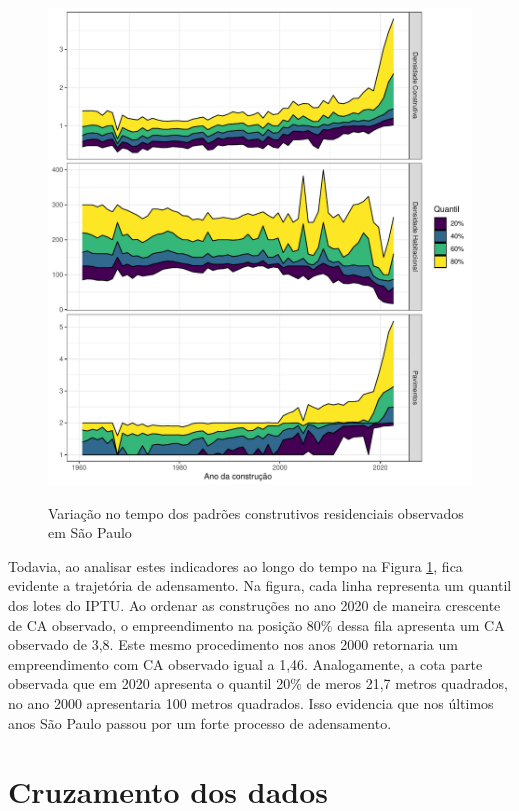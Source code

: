 \begin{figure}[h]
    \centering
    \caption{Variação no tempo dos padrões construtivos residenciais observados em São Paulo}
    \includegraphics[width = \linewidth]{imagens/indicadores_tempo.pdf}
    \label{fig:indicadores-tempo}
\end{figure}

Todavia, ao analisar estes indicadores ao longo do tempo na Figura \ref{fig:indicadores-tempo}, fica evidente a trajetória de adensamento. Na figura, cada linha representa um quantil dos lotes do IPTU. Ao ordenar as construções no ano 2020 de maneira crescente de CA observado, o empreendimento na posição 80\% dessa fila apresenta um CA observado de 3,8. Este mesmo procedimento nos anos 2000 retornaria um empreendimento com CA observado igual a 1,46. Analogamente, a cota parte observada que em 2020 apresenta o quantil 20\% de meros 21,7 metros quadrados, no ano 2000 apresentaria 100 metros quadrados. Isso evidencia que nos últimos anos São Paulo passou por um forte processo de adensamento.

\section{Cruzamento dos dados}


